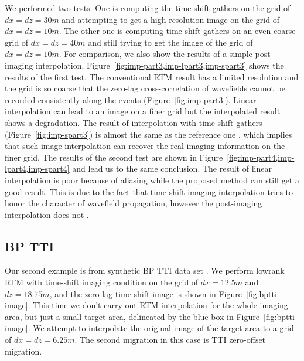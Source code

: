 We performed two tests. One is computing the time-shift gathers on the grid of $dx=dz=30m$ 
and attempting to get a high-resolution image on the grid of $dx=dz=10m$.
The other one is computing time-shift gathers on an even coarse grid of $dx=dz=40m$ 
and still trying to get the image of the grid of $dx=dz=10m$.
For comparison, we also show the results of a simple post-imaging interpolation. 
Figure~\ref{fig:imp-part3,imp-lpart3,imp-spart3} shows the results of the first test. 
The conventional RTM result has a limited resolution and the grid is so coarse that
the zero-lag cross-correlation of wavefields cannot be recorded consistently along the events (Figure~\ref{fig:imp-part3}). 
Linear interpolation can lead to an image on a finer grid but the interpolated result shows a degradation.
The result of interpolation with time-shift gathers (Figure~\ref{fig:imp-spart3}) is almost the same as the reference one
, which implies that such image interpolation can recover the real imaging information on the finer grid.
The results of the second test are shown in Figure~\ref{fig:imp-part4,imp-lpart4,imp-spart4} and lead us to the same conclusion.
The result of linear interpolation is poor because of aliasing while the proposed method can still get a good result.
This is due to the fact that time-shift imaging interpolation tries to honor the character of wavefield propagation, 
however the post-imaging interpolation does not \cite[]{ng07}.


\subsection{BP TTI}

Our second example is from synthetic BP TTI data set \cite[]{shah07}.
We perform lowrank RTM \cite[]{fomel13,sun13} with time-shift imaging condition on the grid of $dx=12.5m$ and $dz=18.75m$, 
and the zero-lag time-shift image is shown in Figure~\ref{fig:bptti-image}.
This time we don't carry out RTM interpolation for the whole imaging area,
but just a small target area, delineated by the blue box in Figure~\ref{fig:bptti-image}.
We attempt to interpolate the original image of the target area to a grid of $dx=dz=6.25m$.
The second migration in this case is TTI zero-offset migration.

